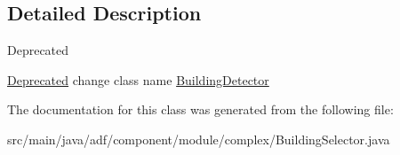 \subsection{Detailed Description}
\begin{DoxyRefDesc}{Deprecated}
\item[\hyperlink{deprecated__deprecated000013}{Deprecated}]change class name \hyperlink{classadf_1_1component_1_1module_1_1complex_1_1BuildingDetector}{Building\+Detector} \end{DoxyRefDesc}


The documentation for this class was generated from the following file\+:\begin{DoxyCompactItemize}
\item 
src/main/java/adf/component/module/complex/Building\+Selector.\+java\end{DoxyCompactItemize}

